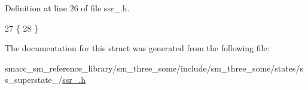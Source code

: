 Definition at line 26 of file ssr\+\_.\+h.


\begin{DoxyCode}
27   \{
28   \}
\end{DoxyCode}


The documentation for this struct was generated from the following file\+:\begin{DoxyCompactItemize}
\item 
smacc\+\_\+sm\+\_\+reference\+\_\+library/sm\+\_\+three\+\_\+some/include/sm\+\_\+three\+\_\+some/states/ss\+\_\+superstate\+\_/\hyperlink{ssr__2_8h}{ssr\+\_.\+h}\end{DoxyCompactItemize}
